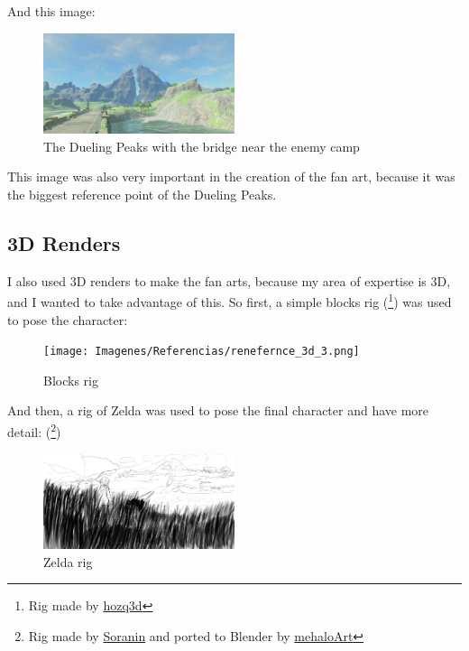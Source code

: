 \documentclass{cup-pan}
\begin{document}
    And this image: 
    \begin{figure}[H]
        \includegraphics[width=0.5\textwidth]{Imagenes/Referencias/Dueling_Peaks.png}
        \caption{The Dueling Peaks with the bridge near the enemy camp}
    \end{figure}
    This image was also very important in the creation of the fan art, because it was the biggest reference point of the Dueling Peaks.\\

    \subsection*{3D Renders}
    I also used 3D renders to make the fan arts, because my area of expertise is 3D, and I wanted to take advantage of this.
    So first, a simple blocks rig
    (\footnote{Rig made by 
    \href{https://hozq3d.gumroad.com/l/Blocks}{hozq3d}}) 
    was used to pose the character: 
    \begin{figure}[H]
        \texttt{[image: Imagenes/Referencias/renefernce\_3d\_3.png]}
        \caption{Blocks rig}
    \end{figure}

    And then, a rig of Zelda was used to pose the final character and have more detail:    
    (\footnote{Rig made by 
    \href{https://www.youtube.com/watch?v=1EUcGBMVRbA}{Soranin} and ported to Blender by  
    \href{https://twitter.com/mehaloArt/status/1528197222751383552?s=20}{mehaloArt}})

    \begin{figure}[H]
        \includegraphics[width=0.5\textwidth]{Imagenes/Referencias/ref_zelda.png}
        \caption{Zelda rig}
    \end{figure}
\end{document}
